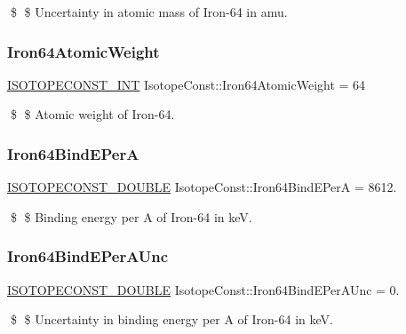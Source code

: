 \$ \$ Uncertainty in atomic mass of Iron-\/64 in amu. \mbox{\label{group___isotope_const-_iron-_fe64_gaeb152e67010172fc44d7489494beac1a}} 
\subsubsection{\texorpdfstring{Iron64\+Atomic\+Weight}{Iron64AtomicWeight}}
{\footnotesize\ttfamily \mbox{\hyperlink{group___isotope_const-_macros_ga5f18360b3e99483a35c32d789e62621c}{I\+S\+O\+T\+O\+P\+E\+C\+O\+N\+S\+T\+\_\+\+I\+NT}} Isotope\+Const\+::\+Iron64\+Atomic\+Weight = 64}

\$ \$ Atomic weight of Iron-\/64. \mbox{\label{group___isotope_const-_iron-_fe64_gae41667ae974d2ad171c7700c305d3636}} 
\subsubsection{\texorpdfstring{Iron64\+Bind\+E\+PerA}{Iron64BindEPerA}}
{\footnotesize\ttfamily \mbox{\hyperlink{group___isotope_const-_macros_ga8f45a7272ce02c0b4c65c44636ed719a}{I\+S\+O\+T\+O\+P\+E\+C\+O\+N\+S\+T\+\_\+\+D\+O\+U\+B\+LE}} Isotope\+Const\+::\+Iron64\+Bind\+E\+PerA = 8612.}

\$ \$ Binding energy per A of Iron-\/64 in keV. \mbox{\label{group___isotope_const-_iron-_fe64_gaf0c3d8abed04cca3c67e25bb6b57a8b9}} 
\subsubsection{\texorpdfstring{Iron64\+Bind\+E\+Per\+A\+Unc}{Iron64BindEPerAUnc}}
{\footnotesize\ttfamily \mbox{\hyperlink{group___isotope_const-_macros_ga8f45a7272ce02c0b4c65c44636ed719a}{I\+S\+O\+T\+O\+P\+E\+C\+O\+N\+S\+T\+\_\+\+D\+O\+U\+B\+LE}} Isotope\+Const\+::\+Iron64\+Bind\+E\+Per\+A\+Unc = 0.}

\$ \$ Uncertainty in binding energy per A of Iron-\/64 in keV. \mbox{\label{group___isotope_const-_iron-_fe64_ga1085222669e922c6c41ce0514979c164}} 

